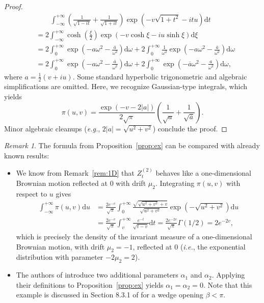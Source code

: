 \documentclass{article}
\theoremstyle{plain}
\theoremstyle{definition}
\theoremstyle{remark}
\newtheorem{remark}[theorem]{Remark}
\begin{document}
\begin{proof}
    \begin{align*}
        &\quad\!\quad\int_{-\infty}^{+\infty}\left(\frac{1}{\sqrt{1-it}}+\frac{1}{\sqrt{1+it}}\right)\exp\left(-v\sqrt{1+t^2}-itu\right)\mathrm{d}t\\
        &=2\int_{-\infty}^{+\infty}\cosh\left(\frac{\xi}{2}\right)\exp\left(-v\cosh \xi -iu\sinh \xi\right)\mathrm{d}\xi\\
        &=2\int_0^{+\infty}\exp\left(-a\omega^2-\frac{\overline{a}}{\omega^2}\right)\mathrm{d}\omega+2\int_0^{+\infty}\frac{1}{\omega^2}\exp\left(-a\omega^2-\frac{\overline{a}}{\omega^2}\right)\mathrm{d}\omega\\
        &=2\int_0^{+\infty}\exp\left(-a\omega^2-\frac{\overline{a}}{\omega^2}\right)\mathrm{d}\omega+2\int_0^{+\infty}\exp\left(-\overline{a}\omega^2-\frac{a}{\omega^2}\right)\mathrm{d}\omega,
    \end{align*}
    where $a=\frac12(v+iu)$. Some standard hyperbolic trigonometric and algebraic simplifications are omitted. Here, we recognize Gaussian-type integrals, which yields
    $$\pi(u,v)=\frac{\exp(-v-2|a|)}{2\sqrt{\pi}}\left(\frac{1}{\sqrt{a}}+\frac{1}{\sqrt{\overline{a}}}\right).$$
    Minor algebraic cleanups (\textit{e.g.}, $2|a|=\sqrt{u^2+v^2}$) conclude the proof.
\end{proof}

\begin{remark} The formula from Proposition~\ref{prop:ex} can be compared with already known results:
\begin{itemize}
    \item We know from Remark~\ref{rem:1D} that $Z_t^{(2)}$ behaves like a one-dimensional Brownian motion reflected at $0$ with drift $\mu_2$. Integrating $\pi(u,v)$ with respect to $u$ gives 
\begin{align*}
    \int_{-\infty}^{+\infty}\pi(u,v)\mathrm{d}u&=\frac{2e^{-v}}{\sqrt{\pi}}\int_0^{+\infty}\frac{\sqrt{\sqrt{u^2+v^2}+v}}{\sqrt{u^2+v^2}}\exp\left(-\sqrt{u^2+v^2}\right)\mathrm{d}u\\
    &=\frac{2e^{-v}}{\sqrt{\pi}}\int_v^{+\infty}\frac{e^{-t}}{\sqrt{t-v}}\mathrm{d}t=\frac{2e^{-2v}}{\sqrt{\pi}}\Gamma(1/2)=2e^{-2v},
\end{align*}
which is precisely the density of the invariant measure of a one-dimensional Brownian motion, with drift $\mu_2=-1$, reflected at $0$ (\textit{i.e.}, the exponential distribution with parameter $-2\mu_2=2$).
\item The authors of \cite{BoMe} introduce two additional parameters $\alpha_1$ and $\alpha_2$. Applying their definitions to Proposition~\ref{prop:ex} yields $\alpha_1=\alpha_2=0$. Note that this example is discussed in Section 8.3.1 of \cite{BoMe} for a wedge opening $\beta<\pi$.
\end{itemize}
\end{remark}
\end{document}
